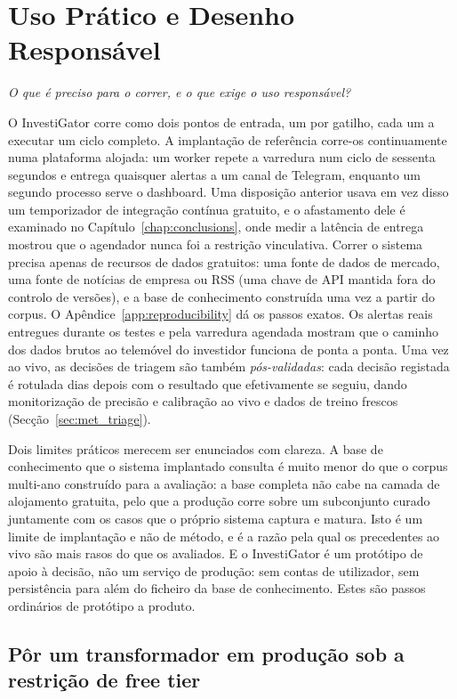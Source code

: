 \section{Uso Prático e Desenho Responsável}
\label{sec:investigator_deploy}

\emph{O que é preciso para o correr, e o que exige o uso responsável?}

O InvestiGator corre como dois pontos de entrada, um por gatilho, cada um a executar um ciclo completo. A
implantação de referência corre-os continuamente numa plataforma alojada: um worker repete a varredura num
ciclo de sessenta segundos e entrega quaisquer alertas a um canal de Telegram, enquanto um segundo processo
serve o dashboard. Uma disposição anterior usava em vez disso um temporizador de integração contínua
gratuito, e o afastamento dele é examinado no Capítulo~\ref{chap:conclusions}, onde medir a latência de
entrega mostrou que o agendador nunca foi a restrição vinculativa. Correr o sistema precisa apenas
de recursos de dados gratuitos: uma fonte de dados de mercado, uma fonte de notícias de empresa ou RSS (uma
chave de API mantida fora do controlo de versões), e a base de conhecimento construída uma vez a partir do
corpus. O
Apêndice~\ref{app:reproducibility} dá os passos exatos. Os alertas reais entregues durante os testes e pela
varredura agendada mostram que o caminho dos dados brutos ao telemóvel do investidor funciona de ponta a
ponta. Uma vez ao vivo, as decisões de triagem são também \emph{pós-validadas}: cada decisão registada é
rotulada dias depois com o resultado que efetivamente se seguiu, dando monitorização de precisão e
calibração ao vivo e dados de treino frescos (Secção~\ref{sec:met_triage}).

Dois limites práticos merecem ser enunciados com clareza. A base de conhecimento que o sistema implantado
consulta é muito menor do que o corpus multi-ano construído para a avaliação: a base completa não cabe na
camada de alojamento gratuita, pelo que a produção corre sobre um subconjunto curado juntamente com os
casos que o próprio sistema captura e matura. Isto é um limite de implantação e não de método, e é a razão
pela qual os precedentes ao vivo são mais rasos do que os avaliados. E o InvestiGator é um protótipo de
apoio à decisão, não um serviço de produção: sem contas de utilizador, sem persistência para além do
ficheiro da base de conhecimento. Estes são passos ordinários de protótipo a produto.

\subsection*{Pôr um transformador em produção sob a restrição de free tier}

